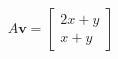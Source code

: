 \documentclass[preview]{standalone}
\begin{document}
\begin{align*}
A\mathbf{v} = \begin{bmatrix} 2x + y \\ x + y \end{bmatrix}
\end{align*}
\end{document}
